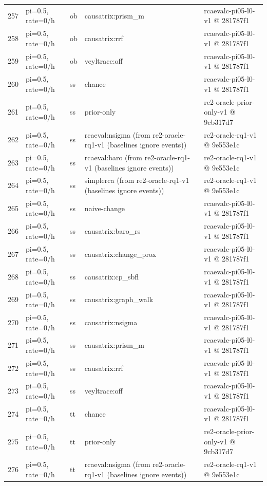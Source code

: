 \begin{longtable}{@{}r>{\raggedright\arraybackslash}p{48.0pt}>{\raggedright\arraybackslash}p{18.0pt}>{\raggedright\arraybackslash}p{108.0pt}>{\raggedright\arraybackslash}p{105.0pt}@{}}
257 & pi=0.5, rate=0/h & ob & causatrix:prism\_m & rcaevalc-pi05-l0-v1 @ 281787f1 \\
258 & pi=0.5, rate=0/h & ob & causatrix:rrf & rcaevalc-pi05-l0-v1 @ 281787f1 \\
259 & pi=0.5, rate=0/h & ob & veyltrace:off & rcaevalc-pi05-l0-v1 @ 281787f1 \\
260 & pi=0.5, rate=0/h & ss & chance & rcaevalc-pi05-l0-v1 @ 281787f1 \\
261 & pi=0.5, rate=0/h & ss & prior-only & re2-oracle-prior-only-v1 @ 9cb317d7 \\
262 & pi=0.5, rate=0/h & ss & rcaeval:nsigma (from re2-oracle-rq1-v1 (baselines ignore events)) & re2-oracle-rq1-v1 @ 9e553e1c \\
263 & pi=0.5, rate=0/h & ss & rcaeval:baro (from re2-oracle-rq1-v1 (baselines ignore events)) & re2-oracle-rq1-v1 @ 9e553e1c \\
264 & pi=0.5, rate=0/h & ss & simplerca (from re2-oracle-rq1-v1 (baselines ignore events)) & re2-oracle-rq1-v1 @ 9e553e1c \\
265 & pi=0.5, rate=0/h & ss & naive-change & rcaevalc-pi05-l0-v1 @ 281787f1 \\
266 & pi=0.5, rate=0/h & ss & causatrix:baro\_rs & rcaevalc-pi05-l0-v1 @ 281787f1 \\
267 & pi=0.5, rate=0/h & ss & causatrix:change\_prox & rcaevalc-pi05-l0-v1 @ 281787f1 \\
268 & pi=0.5, rate=0/h & ss & causatrix:cp\_sbfl & rcaevalc-pi05-l0-v1 @ 281787f1 \\
269 & pi=0.5, rate=0/h & ss & causatrix:graph\_walk & rcaevalc-pi05-l0-v1 @ 281787f1 \\
270 & pi=0.5, rate=0/h & ss & causatrix:nsigma & rcaevalc-pi05-l0-v1 @ 281787f1 \\
271 & pi=0.5, rate=0/h & ss & causatrix:prism\_m & rcaevalc-pi05-l0-v1 @ 281787f1 \\
272 & pi=0.5, rate=0/h & ss & causatrix:rrf & rcaevalc-pi05-l0-v1 @ 281787f1 \\
273 & pi=0.5, rate=0/h & ss & veyltrace:off & rcaevalc-pi05-l0-v1 @ 281787f1 \\
274 & pi=0.5, rate=0/h & tt & chance & rcaevalc-pi05-l0-v1 @ 281787f1 \\
275 & pi=0.5, rate=0/h & tt & prior-only & re2-oracle-prior-only-v1 @ 9cb317d7 \\
276 & pi=0.5, rate=0/h & tt & rcaeval:nsigma (from re2-oracle-rq1-v1 (baselines ignore events)) & re2-oracle-rq1-v1 @ 9e553e1c \\

\end{longtable}

